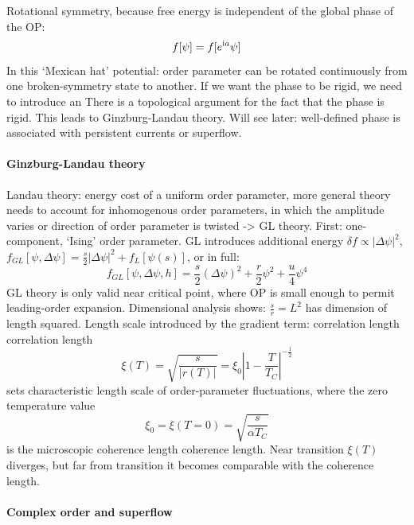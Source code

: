 \documentclass[../notes.tex]{subfiles}
\begin{document}
Rotational symmetry, because free energy is independent of the global phase of the OP:
\begin{equation}
	f [\psi] = f [e^{\mathrm{i} a } \psi]
\end{equation}
In this `Mexican hat' potential: order parameter can be rotated continuously from one broken-symmetry state to another.
If we want the phase to be rigid, we need to introduce an
There is a topological argument for the fact that the phase is rigid.
This leads to Ginzburg-Landau theory.
Will see later: well-defined phase is associated with persistent currents or superflow.

\paragraph{Ginzburg-Landau theory} 

Landau theory: energy cost of a uniform order parameter, more general theory needs to account for inhomogenous order parameters, in which the amplitude varies or direction of order parameter is twisted -> GL theory.
First: one-component, `Ising' order parameter.
GL introduces additional energy \(\delta f \propto \vert \Delta \psi \vert^2\), \(f_{GL} [\psi, \Delta \psi] = \frac{s}{2} \vert \Delta \psi \vert^2 + f_L [\psi(s)]\), or in full:
\begin{equation}
	f_{GL} [\psi, \Delta \psi, h] = \frac{s}{2} (\Delta \psi)^2 + \frac{r}{2} \psi^2 + \frac{u}{4} \psi^4
\end{equation}
GL theory is only valid near critical point, where OP is small enough to permit leading-order expansion.
Dimensional analysis shows: \(\frac{s}{r} = L^2\) has dimension of length squared.
Length scale introduced by the gradient term: correlation length \gls{correlation length}
\begin{equation}
	\xi (T) = \sqrt{\frac{s}{\vert r(T) \vert}} = \xi_0 \left\vert 1 - \frac{T}{T_C} \right\vert^{-\frac{1}{2}}
\end{equation}
sets characteristic length scale of order-parameter fluctuations, where the zero temperature value
\begin{equation}
	\xi_0 = \xi (T = 0) = \sqrt{\frac{s}{\alpha T_C}}
\end{equation}
is the microscopic coherence length \gls{coherence length}.
Near transition \(\xi (T)\) diverges, but far from transition it becomes comparable with the coherence length.

\paragraph{Complex order and superflow} 
\end{document}

